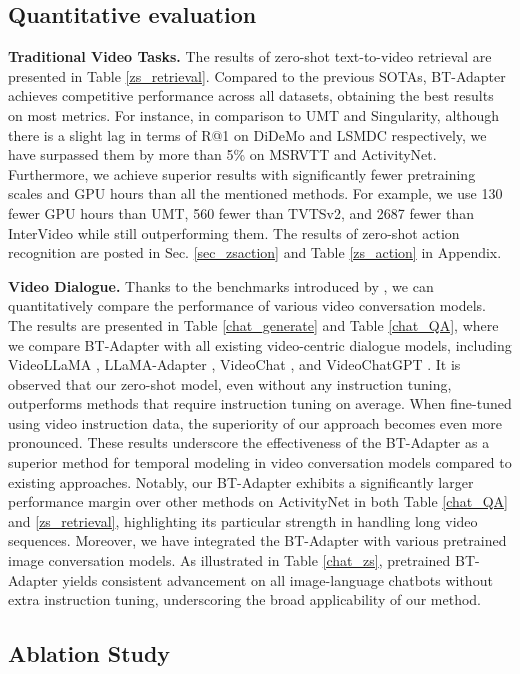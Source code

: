 \documentclass{article} \usepackage{iclr2024_conference,times}
\begin{document}
\subsection{Quantitative evaluation} 
\textbf{Traditional Video Tasks.}
The results of zero-shot text-to-video retrieval are presented in Table \ref{zs_retrieval}. Compared to the previous SOTAs, BT-Adapter achieves competitive performance across all datasets, obtaining the best results on most metrics. For instance, in comparison to UMT and Singularity, although there is a slight lag in terms of R@1 on DiDeMo and LSMDC respectively, we have surpassed them by more than 5\% on MSRVTT and ActivityNet. Furthermore, we achieve superior results with significantly fewer pretraining scales and GPU hours than all the mentioned methods. For example, we use 130 fewer GPU hours than UMT, 560 fewer than TVTSv2, and 2687 fewer than InterVideo while still outperforming them. The results of zero-shot action recognition are posted in Sec. \ref{sec_zsaction} and Table \ref{zs_action} in Appendix.


\textbf{Video Dialogue.} 
Thanks to the benchmarks introduced by \citet{maaz2023video}, we can quantitatively compare the performance of various video conversation models. The results are presented in Table \ref{chat_generate} and Table \ref{chat_QA}, where we compare BT-Adapter with all existing video-centric dialogue models, including VideoLLaMA \citep{zhang2023video}, LLaMA-Adapter \citep{gao2023llama}, VideoChat \citep{li2023videochat}, and VideoChatGPT \citep{maaz2023video}. It is observed that our zero-shot model, even without any instruction tuning, outperforms methods that require instruction tuning on average. When fine-tuned using video instruction data, the superiority of our approach becomes even more pronounced. These results underscore the effectiveness of the BT-Adapter as a superior method for temporal modeling in video conversation models compared to existing approaches. Notably, our BT-Adapter exhibits a significantly larger performance margin over other methods on ActivityNet in both Table \ref{chat_QA} and \ref{zs_retrieval}, highlighting its particular strength in handling long video sequences. Moreover, we have integrated the BT-Adapter with various pretrained image conversation models. As illustrated in Table \ref{chat_zs}, pretrained BT-Adapter yields consistent advancement on all image-language chatbots without extra instruction tuning, underscoring the broad applicability of our method.

\subsection{Ablation Study} 
\end{document}
